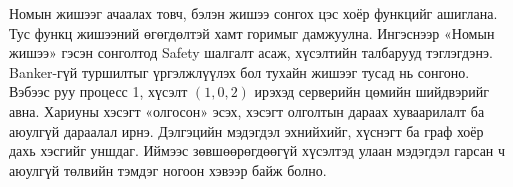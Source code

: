 Номын жишээг ачаалах товч, бэлэн жишээ сонгох цэс хоёр  функцийг ашиглана. Тус функц жишээний өгөгдөлтэй хамт  горимыг дамжуулна. Ингэснээр «Номын жишээ» гэсэн сонголтод Safety шалгалт асаж, хүсэлтийн талбарууд тэглэгдэнэ. Banker-гүй туршилтыг үргэлжлүүлэх бол тухайн жишээг тусад нь сонгоно.
 Вэбээс  руу процесс 1, хүсэлт $(1,0,2)$ ирэхэд серверийн  цөмийн шийдвэрийг авна. Хариуны  хэсэгт «олгосон» эсэх,  хэсэгт олголтын дараах хуваарилалт ба аюулгүй дараалал ирнэ. Дэлгэцийн мэдэгдэл эхнийхийг, хүснэгт ба граф хоёр дахь хэсгийг уншдаг. Иймээс зөвшөөрөгдөөгүй хүсэлтэд улаан мэдэгдэл гарсан ч аюулгүй төлвийн тэмдэг ногоон хэвээр байж болно.
\newpage

